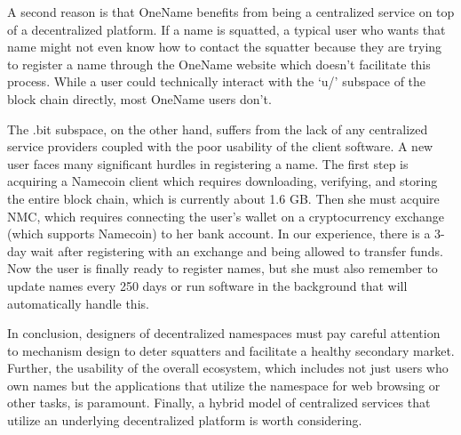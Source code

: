 A second reason is that OneName benefits from being a centralized service on top of a decentralized platform. If a name is squatted, a typical user who wants that name might not even know how to contact the squatter because they are trying to register a name through the OneName website which doesn't facilitate this process. While a user could technically interact with the `u/' subspace of the block chain directly, most OneName users don't.

The .bit subspace, on the other hand, suffers from the lack of any centralized service providers coupled with the poor usability of the client software. A new user faces many significant hurdles in registering a name. The first step is acquiring a Namecoin client which requires downloading, verifying, and storing the entire block chain, which is currently about 1.6 GB. Then she must acquire NMC, which requires connecting the user's wallet on a cryptocurrency exchange (which supports Namecoin) to her bank account. In our experience, there is a 3-day wait after registering with an exchange and being allowed to transfer funds. Now the user is finally ready to register names, but she must also remember to update names every 250 days or run software in the background that will automatically handle this.

In conclusion, designers of decentralized namespaces must pay careful attention to mechanism design to deter squatters and facilitate a healthy secondary market. Further, the usability of the overall ecosystem, which includes not just users who own names but the applications that utilize the namespace for web browsing or other tasks, is paramount. Finally, a hybrid model of centralized services that utilize an underlying decentralized platform is worth considering.

